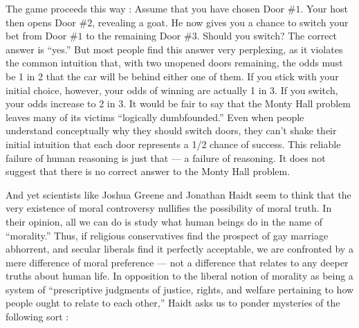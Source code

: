 \documentclass[a4paper,14pt]{extarticle}
\begin{document}
The game proceeds this way :
Assume that you have chosen Door $\#1$.
Your host then opens Door $\#2$, revealing a goat.
He now gives you a chance to switch your bet from Door $\#1$ to the remaining Door $\#3$.
Should you switch? The correct answer is ``yes.''
But most people find this answer very perplexing, as it violates the common intuition that, with two unopened doors remaining, the odds must be 1 in 2 that the car will be behind either one of them.
If you stick with your initial choice, however, your odds of winning are actually 1 in 3.
If you switch, your odds increase to 2 in 3.
It would be fair to say that the Monty Hall problem leaves many of its victims ``logically dumbfounded.''
Even when people understand conceptually why they should switch doors, they can't shake their initial intuition that each door represents a 1/2 chance of success.
This reliable failure of human reasoning is just that --- a failure of reasoning.
It does not suggest that there is no correct answer to the Monty Hall problem.

And yet scientists like Joshua Greene and Jonathan Haidt seem to think that the very existence of moral controversy nullifies the possibility of moral truth.
In their opinion, all we can do is study what human beings do in the name of ``morality.''
Thus, if religious conservatives find the prospect of gay marriage abhorrent, and secular liberals find it perfectly acceptable, we are confronted by a mere difference of moral preference --- not a difference that relates to any deeper truths about human life.
In opposition to the liberal notion of morality as being a system of ``prescriptive judgments of justice, rights, and welfare pertaining to how people ought to relate to each other,'' Haidt asks us to ponder mysteries of the following sort :
\end{document}
